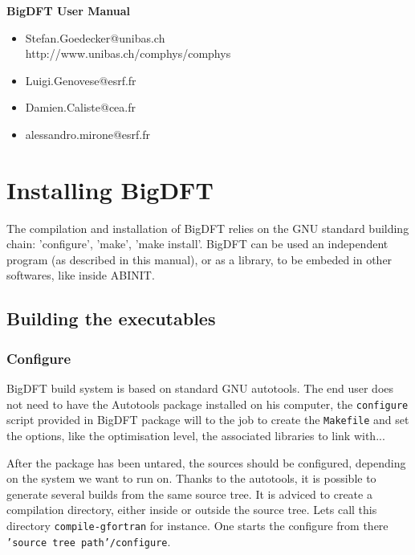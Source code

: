 \documentclass[a4paper,11pt]{report}
\begin{document}

\begin{center} \huge
{\bf \color{red} BigDFT User Manual}
\end{center}

\large
\begin{itemize}
\item Stefan.Goedecker@unibas.ch \\
http://www.unibas.ch/comphys/comphys \\
\item Luigi.Genovese@esrf.fr \\
\item Damien.Caliste@cea.fr \\
\item alessandro.mirone@esrf.fr \\


\end{itemize}
\normalsize
\tableofcontents

\chapter{Installing BigDFT}

The compilation and installation of BigDFT relies on the GNU standard building chain: 'configure', 'make', 'make install'. BigDFT can be used an independent program (as described in this manual), or as a library, to be embeded in other softwares, like inside ABINIT.

\section{Building the executables}

\subsection{Configure}
BigDFT build system is based on standard GNU autotools. The end
user does not need to have the Autotools package installed on his
computer, the \texttt{configure} script provided in BigDFT package
will to the job to create the \texttt{Makefile} and set the
options, like the optimisation level, the associated libraries to link
with...

After the package has been untared, the sources should be configured, depending on the system we want to run on. Thanks to the autotools, it is possible to generate several builds from the same source tree. It is adviced to create a compilation directory, either inside or outside the source tree. Lets call this directory \texttt{compile-gfortran} for instance. One starts the configure from there \texttt{'source tree path'/configure}.
\end{document}
